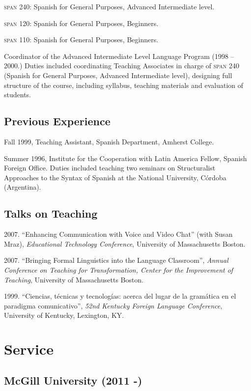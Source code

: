 \documentclass[11pt]{article}
\begin{document}
\textsc{span 240}: Spanish for General Purposes, Advanced Intermediate level.

\textsc{span 120}:  Spanish for General Purposes, Beginners.

 \textsc{span 110}: Spanish for General Purposes, Beginners.


 Coordinator of the Advanced Intermediate Level Language Program (1998
 -- 2000.) Duties included coordinating Teaching Associates in charge
 of \textsc{span} 240 (Spanish for General Purposes, Advanced
 Intermediate level), designing full structure of the course,
 including syllabus, teaching materials and evaluation of students.

\subsection*{\textbf{Previous Experience}}
Fall 1999, Teaching Assistant, Spanish Department, Amherst College.

Summer 1996,  Institute for the Cooperation with Latin America Fellow,  Spanish Foreign Office. Duties included teaching two seminars on Structuralist Approaches to the Syntax of Spanish at the National University, C\'ordoba (Argentina).


\subsection*{Talks on Teaching}


2007. ``Enhancing Communication with Voice and Video Chat'' (with Susan Mraz), \textit{Educational Technology Conference}, University of Massachusetts Boston.

2007. ``Bringing Formal Linguistics into the Language Classroom'', \textit{Annual Conference on Teaching for Transformation, Center for the Improvement of Teaching}, University of Massachusetts Boston.

1999. ``Ciencias, t\'ecnicas y tecnolog\'ias: acerca del lugar de la gram\'atica en el paradigma comunicativo'', \textit{52nd Kentucky Foreign Language Conference}, University of Kentucky, Lexington, KY.

\section*{Service}

\subsection*{McGill University (2011 -)}
\end{document}
